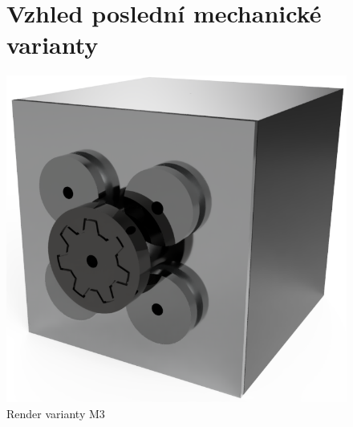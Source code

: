 \begin{figure}
	\section{Vzhled poslední mechanické varianty}
	\vspace{\OdsazeniNadpisu}
    \centering
    \includegraphics[width=\textwidth]{kapitoly/obrazky/M2/predni_render.PNG}
    \caption{Render varianty M3}
    \label{fig:M2-render}
\end{figure}
